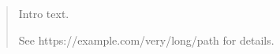 \begin{abstract}
	Intro text.

	See https://example.com/very/long/path for details.%
\end{abstract}
